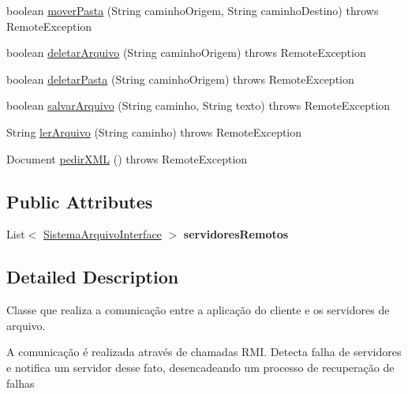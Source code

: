\begin{DoxyCompactItemize}
\item 
boolean \hyperlink{classmiddleware_1_1_middleware_a258024d89a854e48edd71ce1dff7561f}{mover\+Pasta} (String caminho\+Origem, String caminho\+Destino)  throws Remote\+Exception 
\item 
boolean \hyperlink{classmiddleware_1_1_middleware_a91032b272523105aacae765b8d08d02b}{deletar\+Arquivo} (String caminho\+Origem)  throws Remote\+Exception 
\item 
boolean \hyperlink{classmiddleware_1_1_middleware_abd255ccfbaa4d1bf0344e4b4ddb79309}{deletar\+Pasta} (String caminho\+Origem)  throws Remote\+Exception 
\item 
boolean \hyperlink{classmiddleware_1_1_middleware_a3ce87937da7125149daf5b7838cbcdc7}{salvar\+Arquivo} (String caminho, String texto)  throws Remote\+Exception 
\item 
String \hyperlink{classmiddleware_1_1_middleware_a964d56555a150528a80f3ed4b892133f}{ler\+Arquivo} (String caminho)  throws Remote\+Exception 
\item 
Document \hyperlink{classmiddleware_1_1_middleware_a68f1d49902be780c30c4e44689f6b888}{pedir\+X\+M\+L} ()  throws Remote\+Exception 
\end{DoxyCompactItemize}
\subsection*{Public Attributes}
\begin{DoxyCompactItemize}
\item 
\hypertarget{classmiddleware_1_1_middleware_a6e83b6c280f87d8dc499b70297d76182}{List$<$ \hyperlink{interfaceservidor_1_1_sistema_arquivo_interface}{Sistema\+Arquivo\+Interface} $>$ {\bfseries servidores\+Remotos}}\label{classmiddleware_1_1_middleware_a6e83b6c280f87d8dc499b70297d76182}

\end{DoxyCompactItemize}


\subsection{Detailed Description}
Classe que realiza a comunicação entre a aplicação do cliente e os servidores de arquivo.

A comunicação é realizada através de chamadas R\+M\+I. Detecta falha de servidores e notifica um servidor desse fato, desencadeando um processo de recuperação de falhas 

